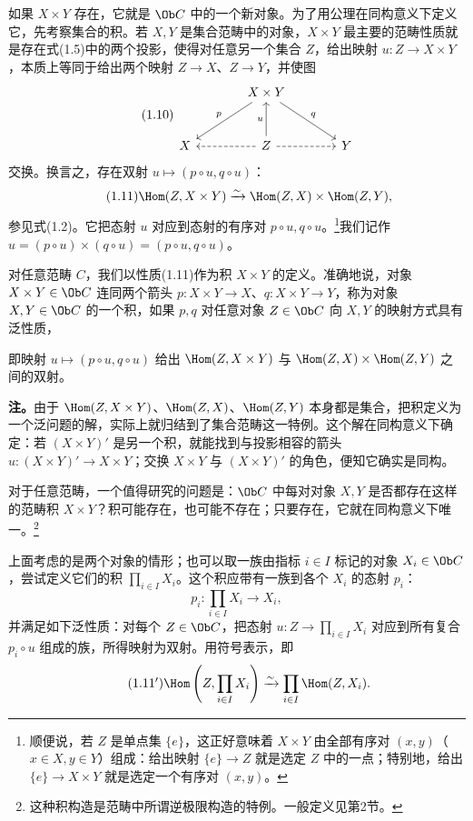如果 $X\times Y$ 存在，它就是 $\Ob C$ 中的一个新对象。为了用公理在同构意义下定义它，先考察集合的积。若 $X,Y$ 是集合范畴中的对象，$X\times Y$ 最主要的范畴性质就是存在式(1.5)中的两个投影，使得对任意另一个集合 $Z$，给出映射 $u:Z\to X\times Y$，本质上等同于给出两个映射 $Z\to X$、$Z\to Y$，并使图
\begin{equation}\tag{1.10}
\begin{tikzcd}[row sep=large,column sep=large,ampersand replacement=\&]
 \& X\times Y\arrow[dl,"p"']\arrow[dr,"q"] \&\\
 X \& Z\arrow[u,"u"]\arrow[l,dashed]\arrow[r,dashed] \&Y
\end{tikzcd}
\end{equation}
交换。换言之，存在双射 $u\mapsto(p\circ u,q\circ u)$：
\begin{equation}\tag{1.11}
 \Hom(Z,X\times Y)\xrightarrow\sim\Hom(Z,X)\times\Hom(Z,Y),
\end{equation}
参见式(1.2)。它把态射 $u$ 对应到态射的有序对 $p\circ u,q\circ u$。\footnote{顺便说，若 $Z$ 是单点集 $\{e\}$，这正好意味着 $X\times Y$ 由全部有序对 $(x,y)$（$x\in X,y\in Y$）组成：给出映射 $\{e\}\to Z$ 就是选定 $Z$ 中的一点；特别地，给出 $\{e\}\to X\times Y$ 就是选定一个有序对 $(x,y)$。}我们记作 $u=(p\circ u)\times(q\circ u)=(p\circ u,q\circ u)$。

对任意范畴 $C$，我们以性质(1.11)作为积 $X\times Y$ 的定义。准确地说，对象 $X\times Y\in\Ob C$ 连同两个箭头 $p:X\times Y\to X$、$q:X\times Y\to Y$，称为对象 $X,Y\in\Ob C$ 的一个积，如果 $p,q$ 对任意对象 $Z\in\Ob C$ 向 $X,Y$ 的映射方式具有泛性质，

即映射 $u\mapsto(p\circ u,q\circ u)$ 给出 $\Hom(Z,X\times Y)$ 与 $\Hom(Z,X)\times\Hom(Z,Y)$ 之间的双射。

\textbf{注。}由于 $\Hom(Z,X\times Y)$、$\Hom(Z,X)$、$\Hom(Z,Y)$ 本身都是集合，把积定义为一个泛问题的解，实际上就归结到了集合范畴这一特例。这个解在同构意义下确定：若 $(X\times Y)'$ 是另一个积，就能找到与投影相容的箭头 $u:(X\times Y)'\to X\times Y$；交换 $X\times Y$ 与 $(X\times Y)'$ 的角色，便知它确实是同构。

对于任意范畴，一个值得研究的问题是：$\Ob C$ 中每对对象 $X,Y$ 是否都存在这样的范畴积 $X\times Y$？积可能存在，也可能不存在；只要存在，它就在同构意义下唯一。\footnote{这种积构造是范畴中所谓逆极限构造的特例。一般定义见第2节。}

上面考虑的是两个对象的情形；也可以取一族由指标 $i\in I$ 标记的对象 $X_i\in\Ob C$，尝试定义它们的积 $\prod_{i\in I}X_i$。这个积应带有一族到各个 $X_i$ 的态射 $p_i$：
\begin{equation}\tag{$1.5'$}
 p_i:\prod_{i\in I}X_i\longrightarrow X_i,
\end{equation}
并满足如下泛性质：对每个 $Z\in\Ob C$，把态射 $u:Z\to\prod_{i\in I}X_i$ 对应到所有复合 $p_i\circ u$ 组成的族，所得映射为双射。用符号表示，即
\begin{equation}\tag{$1.11'$}
 \Hom\left(Z,\prod_{i\in I}X_i\right)\xrightarrow\sim
 \prod_{i\in I}\Hom(Z,X_i).
\end{equation}

